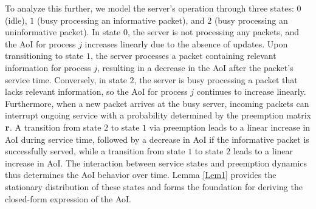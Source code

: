To analyze this further, we model the server's operation through three states: \(0\) (idle), \(1\) (busy processing an informative packet), and \(2\) (busy processing an uninformative packet). In state \(0\), the server is not processing any packets, and the AoI for process \(j\) increases linearly due to the absence of updates. Upon transitioning to state \(1\), the server processes a packet containing relevant information for process \(j\), resulting in a decrease in the AoI after the packet's service time. Conversely, in state \(2\), the server is busy processing a packet that lacks relevant information, so the AoI for process \(j\) continues to increase linearly. Furthermore, when a new packet arrives at the busy server, incoming packets can interrupt ongoing service with a probability determined by the preemption matrix \(\mathbf{r}\). A transition from state \(2\) to state \(1\) via preemption leads to a linear increase in AoI during service time, followed by a decrease in AoI if the informative packet is successfully served, while a transition from state \(1\) to state \(2\) leads to a linear increase in AoI. The interaction between service states and preemption dynamics thus determines the AoI behavior over time. Lemma \ref{Lem1} provides the stationary distribution of these states and forms the foundation for deriving the closed-form expression of the AoI. %








